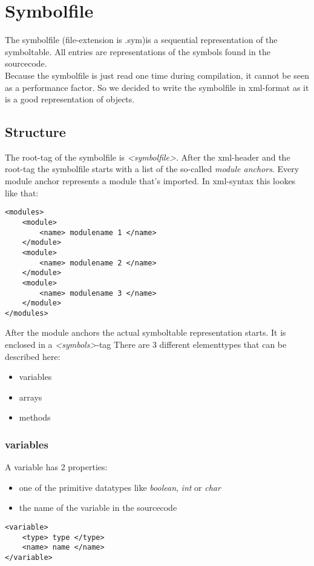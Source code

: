 \section{Symbolfile}
The symbolfile (file-extension is .sym)is a sequential representation of the
symboltable. All entries
are representations of the symbols found in the sourcecode. \\
Because the symbolfile is just read one time during compilation, it cannot be
seen as a performance factor. So we decided to write the symbolfile in
xml-format as it is a good representation of objects. 
\subsection{Structure}
The root-tag of the symbolfile is \emph{<symbolfile>}. After the xml-header and
the root-tag the symbolfile starts with a list of the so-called \emph{module anchors}. Every
module anchor represents a module that's imported. In xml-syntax this lookes
like that:
\begin{lstlisting}[caption={module anchors}]
<modules>
	<module>
		<name> modulename 1 </name>
	</module>
	<module>
		<name> modulename 2 </name>
	</module>
	<module>
		<name> modulename 3 </name>
	</module>
</modules>
\end{lstlisting}

After the module anchors the actual symboltable representation starts. It is
enclosed in a \emph{<symbols>}-tag There are 3 different elementtypes that can be described here:
\begin{itemize}
  \item variables
  \item arrays
  \item methods 
\end{itemize}
\subsubsection{variables}
A variable has 2 properties: 
\begin{itemize}
  \item one of the primitive datatypes like \emph{boolean}, \emph{int} or \emph{char}
  \item the name of the variable in the sourcecode
\end{itemize}

\begin{lstlisting}[caption={variables}]
<variable>
	<type> type </type>
	<name> name </name>
</variable>
\end{lstlisting}


